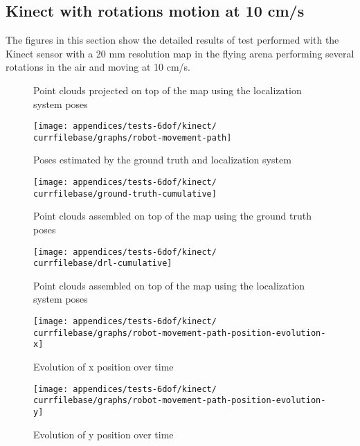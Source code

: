 \subsection{Kinect with rotations motion at 10 cm/s}

The figures in this section show the detailed results of test performed with the Kinect sensor with a 20 mm resolution map in the flying arena performing several rotations in the air and moving at 10 cm/s.


\begin{figure}[H]
	\centering
	\caption{Point clouds projected on top of the map using the localization system poses}
	\label{fig:localization-system-evaluation_kinect_rotations}
\end{figure}

\begin{figure}[H]
	\centering
	\texttt{[image: appendices/tests-6dof/kinect/\\currfilebase/graphs/robot-movement-path]}
	\caption{Poses estimated by the ground truth and localization system}
\end{figure}


\begin{figure}[H]
	\centering
	\texttt{[image: appendices/tests-6dof/kinect/\\currfilebase/ground-truth-cumulative]}
	\caption{Point clouds assembled on top of the map using the ground truth poses}
\end{figure}

\begin{figure}[H]
	\centering
	\texttt{[image: appendices/tests-6dof/kinect/\\currfilebase/drl-cumulative]}
	\caption{Point clouds assembled on top of the map using the localization system poses}
\end{figure}


\begin{figure}[H]
	\centering
	\texttt{[image: appendices/tests-6dof/kinect/\\currfilebase/graphs/robot-movement-path-position-evolution-x]}
	\caption{Evolution of x position over time}
\end{figure}

\begin{figure}[H]
	\centering
	\texttt{[image: appendices/tests-6dof/kinect/\\currfilebase/graphs/robot-movement-path-position-evolution-y]}
	\caption{Evolution of y position over time}
\end{figure}

